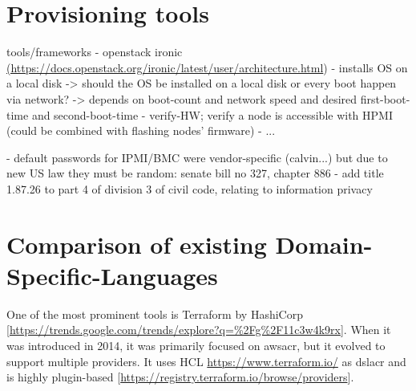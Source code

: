 





\section{Provisioning tools}


tools/frameworks
- openstack ironic \url{(https://docs.openstack.org/ironic/latest/user/architecture.html})
  - installs OS on a local disk
    -> should the OS be installed on a local disk or every boot happen via network?
      -> depends on boot-count and network speed and desired first-boot-time and second-boot-time
  - verify-HW; verify a node is accessible with HPMI (could be combined with flashing nodes' firmware)
- ...

- default passwords for IPMI/BMC were vendor-specific (calvin...) but due to new US law they must be random:
  senate bill no 327, chapter 886 - add title 1.87.26 to part 4 of division 3 of civil code, relating to information privacy

\section{Comparison of existing Domain-Specific-Languages}

One of the most prominent tools is Terraform by HashiCorp [\url{https://trends.google.com/trends/explore?q=%2Fg%2F11c3w4k9rx}]. When it was introduced in 2014, it was primarily focused on \gls{awsacr}, but it evolved to support multiple providers. It uses HCL \url{https://www.terraform.io/} as \gls{dslacr} and is highly plugin-based [\url{https://registry.terraform.io/browse/providers}].
\newline

